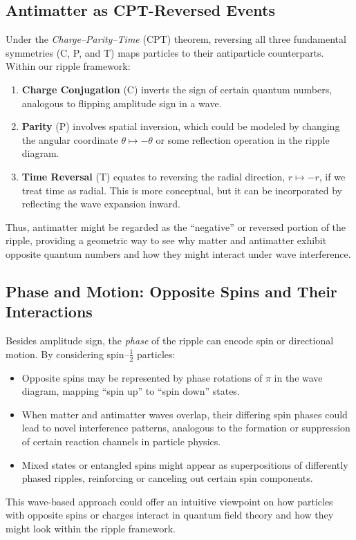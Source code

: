 \documentclass[11pt]{article}
\begin{document}
\subsection{Antimatter as CPT-Reversed Events}
\label{subsec:antimatter-cpt}
Under the \textit{Charge--Parity--Time} (CPT) theorem, reversing all three 
fundamental symmetries (C, P, and T) maps particles to their antiparticle 
counterparts. Within our ripple framework:
\begin{enumerate}
  \item \textbf{Charge Conjugation} (C) 
    inverts the sign of certain quantum numbers, 
    analogous to flipping amplitude sign in a wave.
  \item \textbf{Parity} (P) 
    involves spatial inversion, which could be modeled by changing the 
    angular coordinate \(\theta \mapsto -\theta\) or some reflection operation 
    in the ripple diagram.
  \item \textbf{Time Reversal} (T) 
    equates to reversing the radial direction, \(r \mapsto -r\), if we treat 
    time as radial. This is more conceptual, but it can be incorporated by 
    reflecting the wave expansion inward.
\end{enumerate}
Thus, antimatter might be regarded as the ``negative'' or reversed 
portion of the ripple, providing a geometric way to see why matter 
and antimatter exhibit opposite quantum numbers and how they might 
interact under wave interference.

\subsection{Phase and Motion: Opposite Spins and Their Interactions}
\label{subsec:phase-motion}
Besides amplitude sign, the \textit{phase} of the ripple can encode 
spin or directional motion. By considering spin--\(\tfrac{1}{2}\) 
particles:
\begin{itemize}
  \item Opposite spins may be represented by phase rotations of 
        \(\pi\) in the wave diagram, mapping ``spin up'' to ``spin down'' 
        states.
  \item When matter and antimatter waves overlap, their differing 
        spin phases could lead to novel interference patterns, 
        analogous to the formation or suppression of certain 
        reaction channels in particle physics.
  \item Mixed states or entangled spins might appear as superpositions 
        of differently phased ripples, reinforcing or canceling out 
        certain spin components.
\end{itemize}
This wave-based approach could offer an intuitive viewpoint on how 
particles with opposite spins or charges interact in quantum field 
theory and how they might look within the ripple framework.
\end{document}
